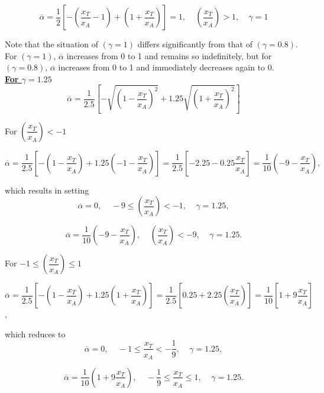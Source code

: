 \begin{equation}
\overline{\alpha} = \dfrac{1}{2} [-(\dfrac{x_T}{x_A}-1)+ (1+\dfrac{x_T}{x_A})]=1,\ \ \ \ \ (\dfrac{x_T}{x_A})>1,\ \ \ \ \ \gamma=1  
\end{equation}

Note that the situation of $(\gamma=1)$ differs significantly from that of $(\gamma=0.8)$. For $(\gamma=1)$, $\overline{\alpha}$ increases from 0 to 1 and remains so indefinitely, but for $(\gamma=0.8)$, $\overline{\alpha}$ increases from 0 to 1 and immediately decreases again to 0.\\


\underline{\textbf{For $\gamma=1.25$}}
\begin{equation}
\overline{\alpha}= \dfrac{1}{2.5}[- \sqrt{(1-\dfrac{x_T}{x_A})^2}+ 1.25 \sqrt{(1+\dfrac{x_T}{x_A})^2}]
\end{equation}

For $(\dfrac{x_T}{x_A})<-1$
\begin{center}
$\overline{\alpha}=\dfrac{1}{2.5}[-(1-\dfrac{x_T}{x_A})+ 1.25 (-1-\dfrac{x_T}{x_A})]= \dfrac{1}{2.5}[-2.25-0.25\dfrac{x_T}{x_A}]=\dfrac{1}{10}(-9-\dfrac{x_T}{x_A}),$
\end{center}

which results in setting 
\begin{equation}
\overline{\alpha}=0,\ \ \ \ \ -9\leq(\dfrac{x_T}{x_A})<-1,\ \ \ \ \ \gamma=1.25,
\end{equation}

\begin{equation}
\overline{\alpha}=\dfrac{1}{10}(-9-\dfrac{x_T}{x_A}),\ \ \ \ \ (\dfrac{x_T}{x_A})<-9,\ \ \ \ \ \gamma=1.25.
\label{g=1.25,r<-1}
\end{equation}

For $-1\leq(\dfrac{x_T}{x_A})\leq1$
\begin{center}
$\overline{\alpha}=\dfrac{1}{2.5}[-(1-\dfrac{x_T}{x_A})+1.25(1+\dfrac{x_T}{x_A})]= \dfrac{1}{2.5}[0.25+2.25(\dfrac{x_T}{x_A})]=\dfrac{1}{10}[1+9\dfrac{x_T}{x_A}]$,
\end{center}

which reduces to 
\begin{equation}
\overline{\alpha}=0,\ \ \ \ \ -1\leq\dfrac{x_T}{x_A}<-\dfrac{1}{9},\ \ \ \ \ \gamma=1.25,
\end{equation}

\begin{equation}
\overline{\alpha}=\dfrac{1}{10} (1+9 \dfrac{x_T}{x_A}),\ \ \ \ \ -\dfrac{1}{9}\leq\dfrac{x_T}{x_A}\leq1,\ \ \ \ \ \gamma=1.25.
\end{equation}

